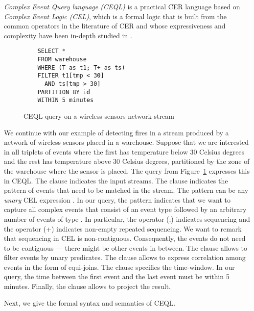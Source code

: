 \emph{Complex Event Query language (CEQL)} is a practical CER language based on \emph{Complex Event Logic (CEL)}, which is a formal logic that is built from the common operators in the literature of CER and whose expressiveness and complexity have been in-depth studied in \cite{formal-framework-cep,on-the-expressiveness,formal-framework-cer}.\bigskip

\begin{figure}[H]
  \begin{verbatim}
    SELECT *
    FROM warehouse
    WHERE (T as t1; T+ as ts)
    FILTER t1[tmp < 30]
      AND ts[tmp > 30]
    PARTITION BY id
    WITHIN 5 minutes
  \end{verbatim}
  \caption{CEQL query on a wireless sensors network stream}
  \label{fig:query}
\end{figure}

We continue with our example of detecting fires in a stream produced by a network of wireless sensors placed in a warehouse. Suppose that we are interested in all triplets of  events where the first has temperature below $30$ Celsius degrees and the rest has temperature above $30$ Celsius degrees, partitioned by the zone of the warehouse where the sensor is placed. The query from Figure~\ref{fig:query} expresses this in CEQL. The  clause indicates the input streams. The  clause indicates the pattern of events that need to be matched in the stream. The pattern can be any \emph{unary} CEL expression \cite{formal-framework-cer}. In our query, the pattern  indicates that we want to capture all complex events that consist of an event type  followed by an arbitrary number of events of type . In particular, the operator (;) indicates sequencing and the operator (+) indicates non-empty repeated sequencing. We want to remark that sequencing in CEL is non-contiguous. Consequently, the  events do not need to be contiguous --- there might be other events in between. The  clause allows to filter events by unary predicates. The clause  allows to express correlation among events in the form of equi-joins. The  clause specifies the time-window. In our query, the time between the first event  and the last event  must be within 5 minutes. Finally, the  clause allows to project the result.

Next, we give the formal syntax and semantics of CEQL.


